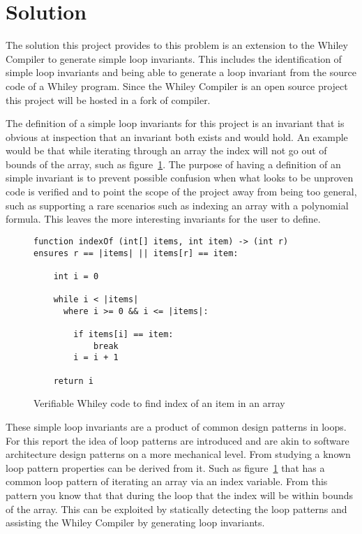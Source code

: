 \section{Solution}

The solution this project provides to this problem is an extension to
the Whiley Compiler to generate simple loop invariants.
This includes the identification of simple loop invariants and being able
to generate a loop invariant from the source code of a Whiley program.
Since the Whiley Compiler is an open source project this project will be
hosted in a fork of compiler.

The definition of a simple loop invariants for this project is an invariant that is
obvious at inspection that an invariant both exists and would hold.
An example would be that while iterating through an array the index
will not go out of bounds of the array, such as figure~\ref{lst:whiley-ex-1}.
The purpose of having a definition of an simple invariant is to prevent
possible confusion when what looks to be unproven code is verified and to point
the scope of the project away from being too general, such as supporting
a rare scenarios such as indexing an array with a polynomial formula.
This leaves the more interesting invariants for the user to define.

\begin{figure}[ht]
\begin{lstlisting}
function indexOf (int[] items, int item) -> (int r)
ensures r == |items| || items[r] == item:

    int i = 0

    while i < |items|
      where i >= 0 && i <= |items|:

        if items[i] == item:
            break
        i = i + 1

    return i
\end{lstlisting}
\caption{Verifiable Whiley code to find index of an item in an array}
\label{lst:whiley-ex-1}
\end{figure}

These simple loop invariants are a product of common design patterns in loops.
For this report the idea of loop patterns are introduced and are akin to
software architecture design patterns on a more mechanical level.
From studying a known loop pattern properties can be derived from it.
Such as figure~\ref{lst:whiley-ex-1} that has a common loop pattern of
iterating an array via an index variable.
From this pattern you know that that during the loop that the index will be
within bounds of the array.
This can be exploited by statically detecting the loop patterns and assisting
the Whiley Compiler by generating loop invariants.

